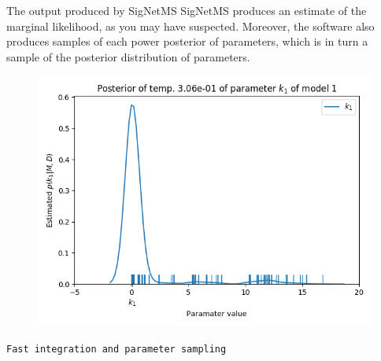 \documentclass{beamer}
\begin{document}
\begin{frame}{The output produced by SigNetMS}
SigNetMS produces an estimate of the marginal likelihood, as you may
have suspected. \pause Moreover, the software also produces samples of
each power posterior of parameters, which is in turn a sample of the
posterior distribution of parameters.
\pause
\begin{figure}
\centering
\includegraphics[clip=true,width=.65\linewidth]{experiments/results/girolami/gamma/snm/model1_29_p0_k_1.png}
\end{figure}
\end{frame}

\begin{frame}{}
\begin{center}
    \texttt{Fast integration and parameter sampling}
\end{center}
\end{frame}

% 



\end{document}
